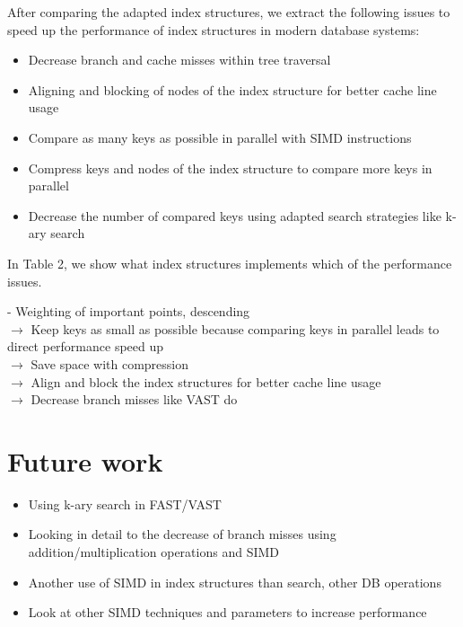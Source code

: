 \documentclass[conference]{IEEEtran}
\begin{document}
After comparing the adapted index structures, we extract the following issues to speed up the performance of index structures in modern database systems:
\begin{itemize}
	\item Decrease branch and cache misses within tree traversal
	\item Aligning and blocking of nodes of the index structure for better cache line usage
	\item Compare as many keys as possible in parallel with SIMD instructions
	\item Compress keys and nodes of the index structure to compare more keys in parallel
	\item Decrease the number of compared keys using adapted search strategies like k-ary search
\end{itemize}

In Table 2, we show what index structures implements which of the performance issues.

- Weighting of important points, descending\\
$\rightarrow$ Keep keys as small as possible because comparing keys in parallel leads to direct performance speed up\\
$\rightarrow$ Save space with compression\\
$\rightarrow$ Align and block the index structures for better cache line usage\\
$\rightarrow$ Decrease branch misses like VAST do\\

\section{Future work}
\begin{itemize}
	\item Using k-ary search in FAST/VAST
	\item Looking in detail to the decrease of branch misses using addition/multiplication operations and SIMD
	\item Another use of SIMD in index structures than search, other DB operations
	\item Look at other SIMD techniques and parameters to increase performance
\end{itemize}
\end{document}
